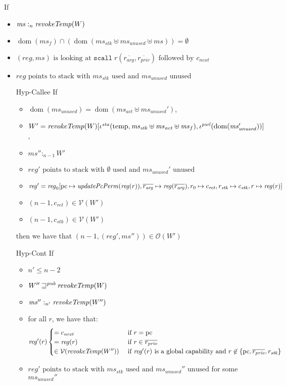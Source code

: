 \documentclass[a4paper]{article}
\DeclareMathOperator{\dom}{dom}
\newcommand{\var}[1]{\mathit{#1}}
\newcommand{\hs}{\var{ms}}
\newcommand{\ms}{\hs}
\newcommand{\pcreg}{\mathrm{pc}}
\newcommand{\reg}{\var{reg}}
\newcommand{\heap}{\var{mem}}
\newcommand{\stk}{\var{stk}}
\newcommand{\pwl}{\var{pwl}}
\newcommand{\sta}{\var{sta}}
\newcommand{\plainfun}[2]{
  \ifthenelse{\equal{#2}{}}
  {\mathit{#1}}
  {\mathit{#1}(#2)}
}
\newcommand{\updatePcPerm}[1]{\plainfun{updatePcPerm}{#1}}
\newcommand{\revokeTemp}[1]{\plainfun{revokeTemp}{#1}}
\newcommand{\futurewk}{\mathbin{\sqsupseteq}^{\var{pub}}}
\newcommand{\heapSat}[3][\heap]{#1 :_{#2} #3}
\newcommand{\memSat}[3][n]{\heapSat[#2]{#1}{#3}}
\newcommand{\asmType}{\plaindom{AsmType}}
\newcommand{\plaindom}[1]{\mathrm{#1}}
\newcommand{\intr}[2]{\mathcal{#1}}
\newcommand{\valueintr}[1]{\intr{V}{#1}}
\newcommand{\stdvr}{\valueintr{\asmType}}
\newcommand{\observations}{\mathcal{O}}
\newcommand{\npair}[2][n]{\left(#1,#2 \right)}
\newcommand{\plainview}[1]{\mathrm{#1}}
\newcommand{\temp}{\plainview{temp}}
\begin{document}
\begin{lemma}
  \label{lem:scall-works}
  If
  \begin{itemize}
  \item $\memSat[n]{\ms}{\revokeTemp{W}}$ 
  \item $\dom(\ms_f) \cap (\dom(\ms_\stk \uplus \ms_{\mathit{unused}} \uplus \ms)) = \emptyset$
  \item $(\reg,\ms) \text{ is looking at }
    \mathtt{scall}\;r(\overline{r_{\mathit{arg}}},
    \overline{r_{\mathit{priv}}}) \text{ followed by } c_{\mathit{next}}$
  \item $\reg \text{ points to stack with $\ms_\stk$ used and $\ms_{\mathit{unused}}$ unused}$
  \item[Hyp-Callee] If
    \begin{itemize}
    \item $\dom(\ms_{\mathit{unused}}) = \dom(\ms_{\mathit{act}}
      \uplus \ms_{\mathit{unused}}')$,
    \item $W' =
      \revokeTemp{W}[\iota^{\sta}(\temp,\ms_\stk\uplus\ms_{\mathit{act}} \uplus \ms_f),\iota^{\pwl}(\dom(\ms_{\mathit{unused}}'))]$,
    \item $\memSat[n-1]{\ms''}{W'}$
    \item $\reg' \text{ points to stack with $\emptyset$ used and $\ms_{\mathit{unused}}'$ unused}$
    \item $\reg'= \reg_0[\pcreg\mapsto\updatePcPerm{\reg(r)},
      \overline{r_{\mathit{arg}}} \mapsto \reg(\overline{r_{\mathit{arg}}}),r_0
      \mapsto c_{\mathit{ret}}, r_\stk \mapsto c_\stk, r \mapsto \reg(r)]$ 
    \item $\npair[n-1]{c_{\mathit{ret}}} \in \stdvr(W')$
    \item $\npair[n-1]{c_\stk} \in \stdvr(W')$
    \end{itemize}

    then we have that $\npair[n-1]{(\reg',\ms'')} \in \observations(W')$
  \item[Hyp-Cont] If
    \begin{itemize}
    \item $n' \leq n-2$
    \item $W'' \futurewk \revokeTemp{W}$
    \item $\memSat[n']{\ms''}{\revokeTemp{W''}}$ 
    \item for all $r$, we have that:
      \begin{equation*}
        \reg'(r)
        \begin{cases}
          = c_{\mathit{next}} &\text{ if } r = \pcreg\\
          = \reg(r)&\text{ if } r \in \overline{r_{\mathit{priv}}}\\
          \in \stdvr(\revokeTemp{W''}) &\text{ if $\reg'(r)$ is a global capability and } r \not\in \{\pcreg,\overline{r_{\mathit{priv}}}, r_\stk\}
        \end{cases}
      \end{equation*}
    \item $\reg' \text{ points to stack with $\ms_\stk$ used and $\ms_{\mathit{unused}}''$ unused}$ for some $\ms_{\mathit{unused}}''$
    \end{itemize}


\end{itemize}
\end{lemma}
\end{document}
